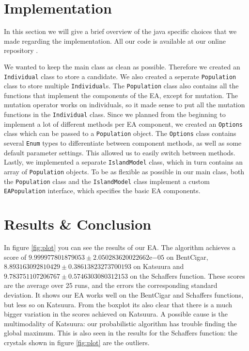 \section{Implementation}\label{sec:implementation}
In this section we will give a brief overview of the java specific choices that we made regarding
the implementation. All our code is available at our online repository \cite{github}.

\noindent We wanted to keep the main class as clean as possible. Therefore we created an
\texttt{Individual} class to store a candidate. We also created a seperate
\texttt{Population} class to store multiple \texttt{Individual}s. The
\texttt{Population} class also contains all the functions that implement the components
of the EA, except for mutation. The mutation operator works on individuals, so it made sense to put
all the mutation functions in the \texttt{Individual} class. Since we planned from the
beginning to implement a lot of different methods per EA component, we created an
\texttt{Options} class which can be passed to a \texttt{Population} object. The
\texttt{Options} class contains several \texttt{Enum} types to differentiate
between component methods, as well as some default parameter settings. This allowed us to easily
switch between methods. Lastly, we implemented a
separate \texttt{IslandModel} class, which in turn contains an array of
\texttt{Population} objects. To be as flexible as possible in our main class, both the
\texttt{Population} class and the \texttt{IslandModel} class implement a custom
\texttt{EAPopulation} interface, which specifies the basic EA components.

\section{Results \& Conclusion}
In figure \ref{fig:plot} you can see the results of our EA. The algorithm achieves a score of
$9.999977801879053 \pm 2.050283620022662\mathrm{e}{-05}$ on BentCigar, $8.893163092810429 \pm
0.38613823273700193$ on Katsuura and $9.783751107206767 \pm 0.5746303080312153$ on the Schaffers
function. These scores are the average over 25 runs, and the errors the corresponding standard
deviation. It shows our EA works well on the BentCigar and Schaffers functions, but less so on
Katsuura. From the boxplot its also clear that there is a much bigger variation in the scores
achieved on Katsuura. A possible cause is the multimodality of Katsuura: our probabilistic algorithm
has trouble finding the global maximum. This is also seen in the results for the Schaffers function:
the crystals shown in figure \ref{fig:plot} are the outliers.

